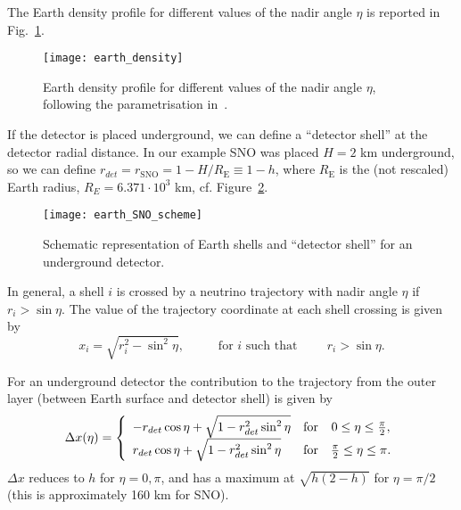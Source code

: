 \documentclass{article}
\begin{document}
The Earth density profile for different values of the nadir angle $\eta$ is reported in Fig.~\ref{fig:earth_density}.

\begin{figure}[ht]
	\texttt{[image: earth\_density]}
	\caption{Earth density profile for different values of the nadir angle $\eta$, following the parametrisation in~\cite{Lisi:1997yc}.}
	\label{fig:earth_density}
\end{figure}

If the detector is placed underground, we can define a ``detector shell'' at the detector radial distance. In our example SNO was placed $H=2$ km underground, so we can define $r_{det} = r_\text{SNO} = 1 - H /R_\text{E} \equiv 1 - h$, where $R_\text{E}$ is the (not rescaled) Earth radius, $R_E = 6.371 \cdot 10^3$ km, cf. Figure~\ref{fig:scheme_detector_shell}.

\begin{figure}[ht]
	\texttt{[image: earth\_SNO\_scheme]}
	\caption{Schematic representation of Earth shells and ``detector shell'' for an underground detector.}
	\label{fig:scheme_detector_shell}
\end{figure} 

In general, a shell $i$ is crossed by a neutrino trajectory with nadir angle $\eta$ if $r_i > \sin \eta$. The value of the trajectory coordinate at each shell crossing is given by 
\begin{equation}
	x_i = \sqrt{r_i^2 - \sin^2 \eta}, \hspace{1cm} \text{ for $i$ such that} \hspace{1cm} r_i > \sin \eta.
\end{equation}

For an underground detector the contribution to the trajectory from the outer layer (between Earth surface and detector shell) is given by
\begin{equation}
	 \Delta x(\eta) = \left\{ \begin{array}{l c c}
		-r_{det} \cos\eta + \sqrt{1 - r_{det}^2 \sin^2 \eta} & \text{for} & 0 \leq \eta \leq \frac{\pi}{2}, \\
		r_{det} \cos\eta + \sqrt{1 - r_{det}^2 \sin^2 \eta} & \text{for} & \frac{\pi}{2} \leq \eta \leq \pi.
	\end{array} \right.
\end{equation}
$\Delta x$ reduces to $h$ for $\eta=0, \pi$, and has a maximum at $\sqrt{h(2-h)}$ for $\eta=\pi/2$ (this is approximately 160 km for SNO).
\end{document}
